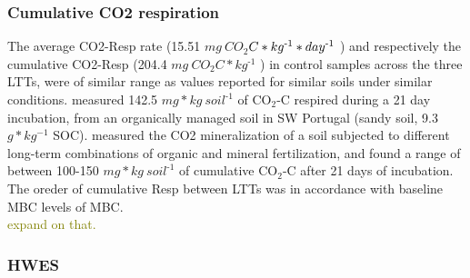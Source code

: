 \documentclass[12pt]{report}
\newcommand{\myGreen}[1]{\textcolor{olive}{#1}} %
\newlength{\SpaceAfterUnit}
\newcommand{\respunit}{$ mg\ CO_2$\text{-}$C * kg^{\text{-}1} * day^{\text{\text{-}}1}$ \hspace*{\SpaceAfterUnit}}
\newcommand{\cumrespunit}{$ mg\ CO_2$\text{-}$C * kg^{\text{-}1}$ \hspace*{\SpaceAfterUnit}}
\newcommand{\genericunit}{$ mg * kg\ soil^{\text{-}1}$ \hspace*{\SpaceAfterUnit}}
\begin{document}
%		
\subsubsection{Cumulative CO2  respiration}

The average CO2-Resp rate (15.51 \respunit) and respectively the cumulative CO2-Resp (204.4 \cumrespunit) in control samples across the three LTTs, were of similar range as values reported for similar soils under similar conditions. \citet{ribeiro2010} measured 142.5 \genericunit of CO$ _2 $-C respired during a 21 day incubation, from an organically managed soil in SW Portugal (sandy soil, 9.3 $ g * kg^{-1} $ SOC). \citet{rudrappa2006} measured the CO2 mineralization of a soil subjected to different long-term combinations of organic and mineral fertilization, and found a range of between 100-150 \genericunit of cumulative CO$ _2 $-C after 21 days of incubation.
The oreder of cumulative Resp between LTTs was in accordance with baseline MBC levels of MBC. \\
\myGreen{expand on that.}

\subsubsection{HWES}
\end{document}
